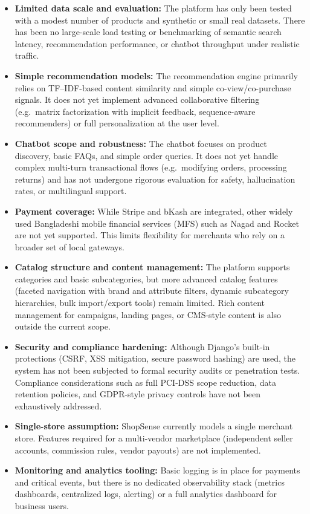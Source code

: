 \begin{itemize}
  \item \textbf{Limited data scale and evaluation:} The platform has only been tested with a modest number of products and synthetic or small real datasets. There has been no large-scale load testing or benchmarking of semantic search latency, recommendation performance, or chatbot throughput under realistic traffic.
  \item \textbf{Simple recommendation models:} The recommendation engine primarily relies on TF--IDF-based content similarity and simple co-view/co-purchase signals. It does not yet implement advanced collaborative filtering (e.g.\ matrix factorization with implicit feedback, sequence-aware recommenders) or full personalization at the user level.
  \item \textbf{Chatbot scope and robustness:} The chatbot focuses on product discovery, basic FAQs, and simple order queries. It does not yet handle complex multi-turn transactional flows (e.g.\ modifying orders, processing returns) and has not undergone rigorous evaluation for safety, hallucination rates, or multilingual support.
  \item \textbf{Payment coverage:} While Stripe and bKash are integrated, other widely used Bangladeshi mobile financial services (MFS) such as Nagad and Rocket are not yet supported. This limits flexibility for merchants who rely on a broader set of local gateways.
  \item \textbf{Catalog structure and content management:} The platform supports categories and basic subcategories, but more advanced catalog features (faceted navigation with brand and attribute filters, dynamic subcategory hierarchies, bulk import/export tools) remain limited. Rich content management for campaigns, landing pages, or CMS-style content is also outside the current scope.
  \item \textbf{Security and compliance hardening:} Although Django’s built-in protections (CSRF, XSS mitigation, secure password hashing) are used, the system has not been subjected to formal security audits or penetration tests. Compliance considerations such as full PCI-DSS scope reduction, data retention policies, and GDPR-style privacy controls have not been exhaustively addressed.
  \item \textbf{Single-store assumption:} ShopSense currently models a single merchant store. Features required for a multi-vendor marketplace (independent seller accounts, commission rules, vendor payouts) are not implemented.
  \item \textbf{Monitoring and analytics tooling:} Basic logging is in place for payments and critical events, but there is no dedicated observability stack (metrics dashboards, centralized logs, alerting) or a full analytics dashboard for business users.
\end{itemize}

